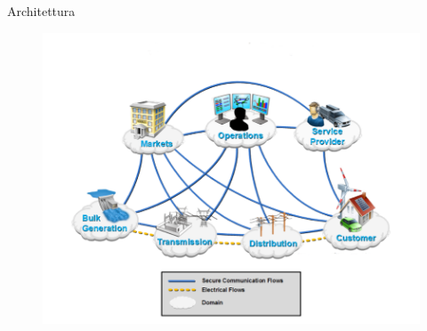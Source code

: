 


\begin{frame}[fragile]{Architettura}
	\begin{figure}[h] 
		\includegraphics[scale=0.6]{imgs/sg.png}
	\end{figure}
\end{frame}


